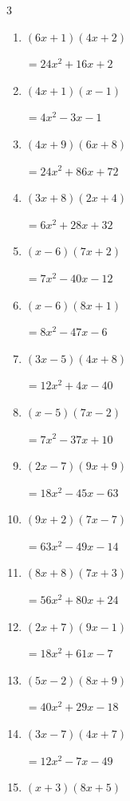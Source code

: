 \begin{multicols}{3}
\begin{enumerate}
        $=8x^{2}+22x-6$

\columnbreak %

\resetques

  \item $(6x+1)(4x+2)$

        $=24x^{2}+16x+2$

  \item $(4x+1)(x-1)$

        $=4x^{2}-3x-1$

  \item $(4x+9)(6x+8)$

        $=24x^{2}+86x+72$

  \item $(3x+8)(2x+4)$

        $=6x^{2}+28x+32$

  \item $(x-6)(7x+2)$

        $=7x^{2}-40x-12$

  \item $(x-6)(8x+1)$

        $=8x^{2}-47x-6$

  \item $(3x-5)(4x+8)$

        $=12x^{2}+4x-40$

  \item $(x-5)(7x-2)$

        $=7x^{2}-37x+10$

  \item $(2x-7)(9x+9)$

        $=18x^{2}-45x-63$

  \item $(9x+2)(7x-7)$

        $=63x^{2}-49x-14$

  \item $(8x+8)(7x+3)$

        $=56x^{2}+80x+24$

  \item $(2x+7)(9x-1)$

        $=18x^{2}+61x-7$

  \item $(5x-2)(8x+9)$

        $=40x^{2}+29x-18$

  \item $(3x-7)(4x+7)$

        $=12x^{2}-7x-49$

  \item $(x+3)(8x+5)$


\end{enumerate}
\end{multicols}
